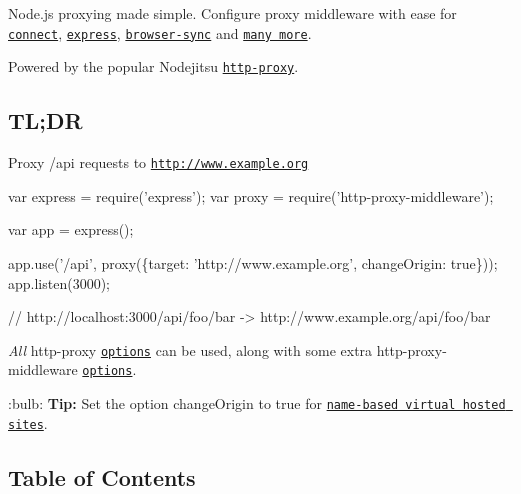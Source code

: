 \href{https://travis-ci.org/chimurai/http-proxy-middleware}{\tt } \href{https://coveralls.io/r/chimurai/http-proxy-middleware}{\tt } \href{https://david-dm.org/chimurai/http-proxy-middleware#info=dependencies}{\tt } \href{https://snyk.io/test/npm/http-proxy-middleware}{\tt }

Node.\+js proxying made simple. Configure proxy middleware with ease for \href{https://github.com/senchalabs/connect}{\tt connect}, \href{https://github.com/strongloop/express}{\tt express}, \href{https://github.com/BrowserSync/browser-sync}{\tt browser-\/sync} and \href{#compatible-servers}{\tt many more}.

Powered by the popular Nodejitsu \href{https://github.com/nodejitsu/node-http-proxy}{\tt {\ttfamily http-\/proxy}}. \href{https://github.com/nodejitsu/node-http-proxy}{\tt }

\subsection*{TL;DR}

Proxy {\ttfamily /api} requests to {\ttfamily \href{http://www.example.org}{\tt http\+://www.\+example.\+org}}


\begin{DoxyCode}
var express = require('express');
var proxy = require('http-proxy-middleware');

var app = express();

app.use('/api', proxy(\{target: 'http://www.example.org', changeOrigin: true\}));
app.listen(3000);

// http://localhost:3000/api/foo/bar -> http://www.example.org/api/foo/bar
\end{DoxyCode}


{\itshape All} {\ttfamily http-\/proxy} \href{https://github.com/nodejitsu/node-http-proxy#options}{\tt options} can be used, along with some extra {\ttfamily http-\/proxy-\/middleware} \href{#options}{\tt options}.

\+:bulb\+: {\bfseries Tip\+:} Set the option {\ttfamily change\+Origin} to {\ttfamily true} for \href{http://en.wikipedia.org/wiki/Virtual_hosting#Name-based}{\tt name-\/based virtual hosted sites}.

\subsection*{Table of Contents}


